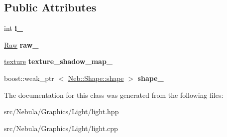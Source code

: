 \subsection*{\-Public \-Attributes}
\begin{DoxyCompactItemize}
\item 
\hypertarget{classNeb_1_1Light_1_1light_a2079447762acf72a0ca78adc39d051d4}{int {\bfseries i\-\_\-}}\label{classNeb_1_1Light_1_1light_a2079447762acf72a0ca78adc39d051d4}

\item 
\hypertarget{classNeb_1_1Light_1_1light_a32a67ab2a769d85a5910fd5c7933edad}{\hyperlink{classNeb_1_1Light_1_1Raw}{\-Raw} {\bfseries raw\-\_\-}}\label{classNeb_1_1Light_1_1light_a32a67ab2a769d85a5910fd5c7933edad}

\item 
\hypertarget{classNeb_1_1Light_1_1light_af5e84b148535324f8f2e9d4f633f6885}{\hyperlink{classNeb_1_1texture}{texture} {\bfseries texture\-\_\-shadow\-\_\-map\-\_\-}}\label{classNeb_1_1Light_1_1light_af5e84b148535324f8f2e9d4f633f6885}

\item 
\hypertarget{classNeb_1_1Light_1_1light_a543df183fd6a21013bb0b99acb2c1f5c}{boost\-::weak\-\_\-ptr\*
$<$ \hyperlink{classNeb_1_1Shape_1_1shape}{\-Neb\-::\-Shape\-::shape} $>$ {\bfseries shape\-\_\-}}\label{classNeb_1_1Light_1_1light_a543df183fd6a21013bb0b99acb2c1f5c}

\end{DoxyCompactItemize}


\-The documentation for this class was generated from the following files\-:\begin{DoxyCompactItemize}
\item 
src/\-Nebula/\-Graphics/\-Light/light.\-hpp\item 
src/\-Nebula/\-Graphics/\-Light/light.\-cpp\end{DoxyCompactItemize}
